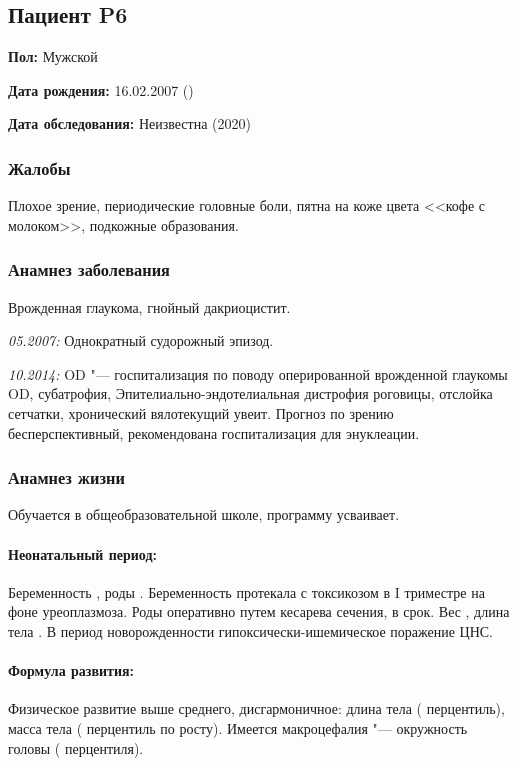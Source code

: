 \documentclass[a4paper,14pt]{extarticle}
\newcommand{\kilogramm}{кг}
\newcommand{\gramm}{г}
\newcommand{\cm}{см}
\newcommand{\pdate}[1]{\emph{#1:} }
\begin{document}
\newpage
\subsection*{Пациент P6}

\textbf{Пол:} Мужской

\textbf{Дата рождения:} 16.02.2007 ()

\textbf{Дата обследования:} Неизвестна (2020)

\subsubsection*{Жалобы}

Плохое зрение, периодические головные боли, пятна на коже цвета <<кофе с молоком>>, подкожные образования.

\subsubsection*{Анамнез заболевания}

Врожденная глаукома, гнойный дакриоцистит.

\pdate{05.2007} Однократный судорожный эпизод.

\pdate{10.2014} OD "--- госпитализация по поводу оперированной врожденной глаукомы OD, субатрофия, 
Эпителиально-эндотелиальная дистрофия роговицы, отслойка сетчатки, хронический вялотекущий увеит.
Прогноз по зрению бесперспективный, рекомендована госпитализация для энуклеации.

\subsubsection*{Анамнез жизни}

Обучается в общеобразовательной школе, программу усваивает.

\paragraph{Неонатальный период:} Беременность , роды . Беременность протекала с токсикозом в I триместре на фоне уреоплазмоза. Роды оперативно путем кесарева сечения, в срок. Вес \numprint[\gramm]{4040}, длина тела \numprint[\cm]{53}. В период новорожденности гипоксически\hyp{}ишемическое поражение ЦНС.

\paragraph{Формула развития:} Физическое развитие выше среднего, дисгармоничное: длина тела \numprint[\cm]{154} ( перцентиль), масса тела \numprint[\kilogramm]{54} ( перцентиль по росту). Имеется макроцефалия "--- окружность головы \numprint[\cm]{59} ( перцентиля). 
\end{document}
